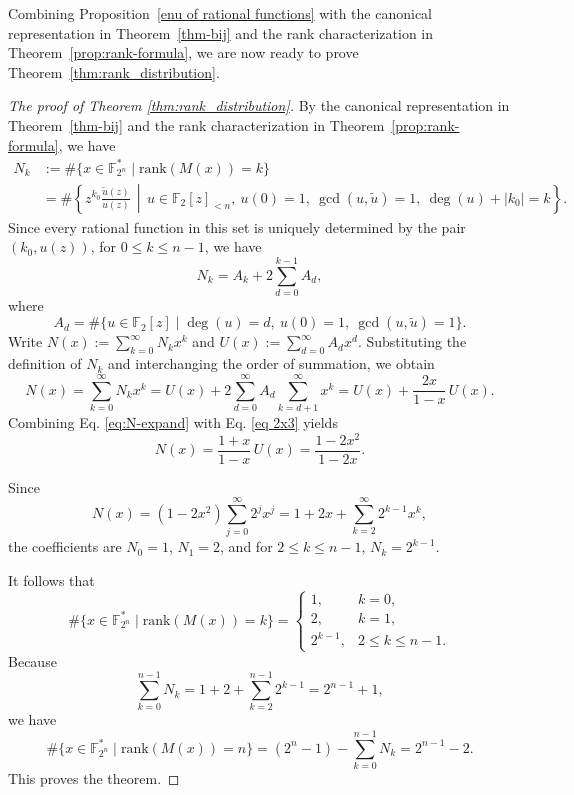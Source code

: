 \documentclass[hidelinks,onefignum,onetabnum]{siamart251216}
\theoremstyle{definition}
\theoremstyle{remark}
\providecommand{\rank}{{\mathrm{rank}}}
\begin{document}
Combining Proposition~\ref{enu of rational functions} with the canonical representation in Theorem~\ref{thm-bij} and the rank characterization in Theorem~\ref{prop:rank-formula}, we are now ready to prove Theorem~\ref{thm:rank_distribution}.

\begin{proof}[The proof of Theorem \ref{thm:rank_distribution}]
By the canonical representation in Theorem~\ref{thm-bij} and the rank characterization in Theorem~\ref{prop:rank-formula}, we have
  \begin{align*}
	N_{k} &:=\#\{x\in \mathbb F_{2^n}^*\mid \rank(M(x))=k\}\\&=\#\left\{
	z^{k_0}\frac{\widetilde u(z)}{u(z)}
	\,\middle|\,
	u\in\mathbb F_2[z]_{<n},\ u(0)=1,\ \gcd(u,\widetilde u)=1,\ \deg(u)+|k_0|=k
	\right\}.
\end{align*} Since every rational function in this set is uniquely determined by the pair $(k_{0},u(z))$, for $0\le k\le n-1$, we have
	\[
	N_k
	=A_k+2\sum_{d=0}^{k-1}A_d,
	\]
where \[
A_d=\#\{u\in \mathbb F_2[z]\mid \deg(u)=d,\ u(0)=1,\ \gcd(u,\widetilde{u})=1\}.
\]
	Write $N(x):=\displaystyle\sum_{k=0}^{\infty}N_k x^k$ and $U(x):=\displaystyle\sum_{d=0}^{\infty}A_d x^d$. Substituting the definition of $N_k$ and interchanging the order of summation, we obtain
	\begin{equation}\label{eq:N-expand}
		N(x)=\sum_{k=0}^{\infty}N_kx^k
		=U(x)+2\sum_{d=0}^{\infty}A_d\sum_{k=d+1}^{\infty}x^k
		=U(x)+\frac{2x}{1-x}\,U(x).
	\end{equation}
	Combining Eq. \eqref {eq:N-expand} with Eq. \eqref{eq 2x3} yields
	\begin{equation}\label{eq:N-closed}
		N(x)=\frac{1+x}{1-x}\,U(x)=\frac{1-2x^2}{1-2x}.
	\end{equation}
	
	Since
	\[
	N(x)=(1-2x^2)\sum_{j=0}^{\infty}2^j x^j
	=1+2x+\sum_{k=2}^{\infty}2^{k-1}x^k,
	\]
	the coefficients are $N_0=1$, $N_1=2$, and for $2\le k\le n-1$, $N_k=2^{k-1}$.
	
	It follows that
	\[
	\#\{x\in \mathbb F_{2^n}^*\mid\rank(M(x))=k\}=
	\begin{cases}
		1, & k=0,\\
		2, & k=1,\\
		2^{k-1}, & 2\le k\le n-1.
	\end{cases}
	\]
	Because
	\[
	\sum_{k=0}^{n-1}N_k
	=1+2+\sum_{k=2}^{n-1}2^{k-1}
	=2^{n-1}+1,
	\]
	we have
	\[
	\#\{x\in \mathbb F_{2^n}^*\mid\rank(M(x))=n\}
	=(2^n-1)-\sum_{k=0}^{n-1}N_k
	=2^{n-1}-2.
	\]
	This proves the theorem.
\end{proof}
\end{document}

